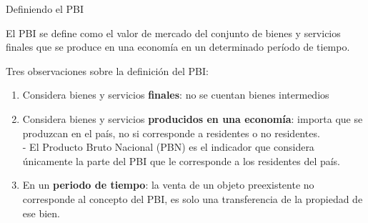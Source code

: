 \documentclass{beamer}
\begin{document}
\begin{frame}{Definiendo el PBI}
    \begin{boxB}
    \centering
        El PBI se define como el valor de mercado del conjunto de bienes y servicios finales que se produce en una economía en un determinado período de tiempo.
    \end{boxB}
\vspace{2mm}
Tres observaciones sobre la definición del PBI:
\begin{enumerate}
    \item Considera bienes y servicios \textbf{finales}: no se cuentan bienes intermedios
    \item Considera bienes y servicios \textbf{producidos en una economía}: importa que se produzcan en el país, no si corresponde a residentes o no residentes. \\
     \footnotesize - El Producto Bruto Nacional (PBN) es el indicador que considera únicamente la parte del PBI que le corresponde a los residentes del país.
    \item En un \textbf{periodo de tiempo}: la venta de un objeto preexistente no corresponde al concepto del PBI, es solo una transferencia de la propiedad de ese bien. 
\end{enumerate}

\end{frame}
\end{document}
